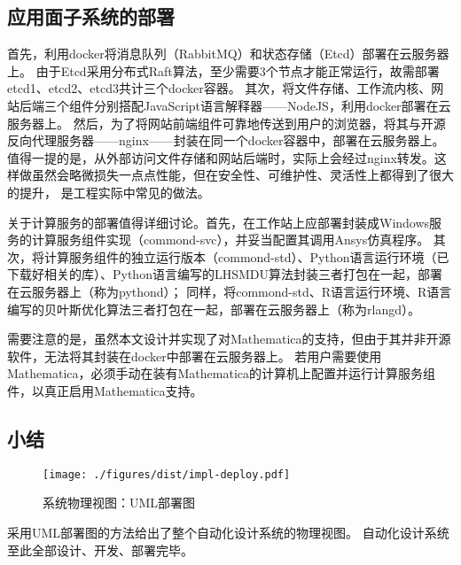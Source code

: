 \documentclass[index]{subfiles}
\begin{document}
\subsection{应用面子系统的部署}
首先，利用docker将消息队列（RabbitMQ）和状态存储（Etcd）部署在云服务器上。
由于Etcd采用分布式Raft算法，至少需要3个节点才能正常运行，故需部署etcd1、etcd2、etcd3共计三个docker容器。
其次，将文件存储、工作流内核、网站后端三个组件分别搭配JavaScript语言解释器——NodeJS，利用docker部署在云服务器上。
然后，为了将网站前端组件可靠地传送到用户的浏览器，将其与开源反向代理服务器——nginx——封装在同一个docker容器中，部署在云服务器上。
值得一提的是，从外部访问文件存储和网站后端时，实际上会经过nginx转发。这样做虽然会略微损失一点点性能，但在安全性、可维护性、灵活性上都得到了很大的提升，
是工程实际中常见的做法。

关于计算服务的部署值得详细讨论。首先，在工作站上应部署封装成Windows服务的计算服务组件实现（commond-svc），并妥当配置其调用Ansys仿真程序。
其次，将计算服务组件的独立运行版本（commond-std）、Python语言运行环境（已下载好相关的库）、Python语言编写的LHSMDU算法封装三者打包在一起，部署在云服务器上（称为pythond）；
同样，将commond-std、R语言运行环境、R语言编写的贝叶斯优化算法三者打包在一起，部署在云服务器上（称为rlangd）。

需要注意的是，虽然本文设计并实现了对Mathematica的支持，但由于其并非开源软件，无法将其封装在docker中部署在云服务器上。
若用户需要使用Mathematica，必须手动在装有Mathematica的计算机上配置并运行计算服务组件，以真正启用Mathematica支持。

\subsection{小结}
\begin{figure}[h]
  \centering
  \texttt{[image: ./figures/dist/impl-deploy.pdf]}
  \caption{系统物理视图：UML部署图\label{fig:impl-deploy}}
\end{figure}
采用UML部署图的方法给出了整个自动化设计系统的物理视图。
自动化设计系统至此全部设计、开发、部署完毕。
\end{document}
